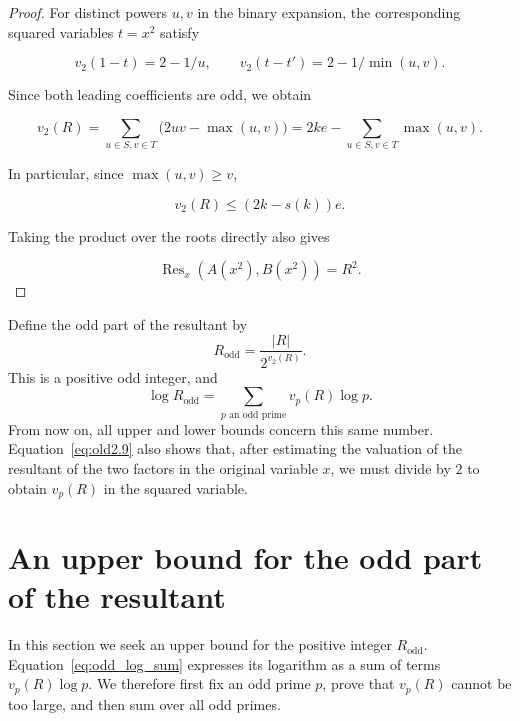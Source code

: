 \documentclass[11pt,a4paper]{article}
\numberwithin{equation}{section}
\theoremstyle{definition}
\begin{document}
\begin{proof}
For distinct powers \(u,v\) in the binary expansion, the corresponding squared variables \(t=x^2\) satisfy

\[
v_2(1-t)=2-1/u,
\qquad
v_2(t-t')=2-1/\min(u,v).
\]

Since both leading coefficients are odd, we obtain

\begin{equation}
v_2(R)=\sum_{u\in S,v\in T}\bigl(2uv-\max(u,v)\bigr)
=2ke-\sum_{u\in S,v\in T}\max(u,v).
\label{eq:old2.7}
\end{equation}

In particular, since \(\max(u,v)\ge v\),

\begin{equation}
v_2(R)\le(2k-s(k))e.
\label{eq:old2.8}
\end{equation}

Taking the product over the roots directly also gives

\begin{equation}
\operatorname{Res}_x(A(x^2),B(x^2))=R^2.
\label{eq:old2.9}
\end{equation}
\end{proof}

Define the odd part of the resultant by
\begin{equation}\label{eq:odd_part}
R_{\mathrm{odd}}=\frac{|R|}{2^{v_2(R)}}.
\end{equation}
This is a positive odd integer, and
\begin{equation}\label{eq:odd_log_sum}
\log R_{\mathrm{odd}}=\sum_{p\text{ an odd prime}}v_p(R)\log p.
\end{equation}
From now on, all upper and lower bounds concern this same number. Equation~\eqref{eq:old2.9} also shows that, after estimating the valuation of the resultant of the two factors in the original variable \(x\), we must divide by \(2\) to obtain \(v_p(R)\) in the squared variable.

\section{An upper bound for the odd part of the resultant}\label{sec:upper}

In this section we seek an upper bound for the positive integer \(R_{\mathrm{odd}}\). Equation~\eqref{eq:odd_log_sum} expresses its logarithm as a sum of terms \(v_p(R)\log p\). We therefore first fix an odd prime \(p\), prove that \(v_p(R)\) cannot be too large, and then sum over all odd primes.
\end{document}
